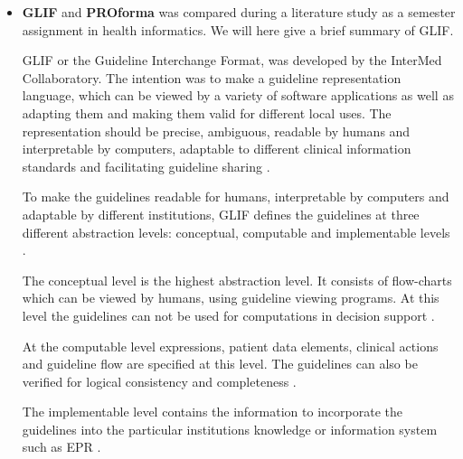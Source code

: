 \begin{itemize}
	\item \textbf{GLIF} and \textbf{PROforma} was compared during a literature study as a semester assignment in health informatics. We will here give a brief summary of GLIF.
	
	 GLIF or the Guideline Interchange Format, was developed by the InterMed Collaboratory. The intention was to make a guideline representation language, which can be viewed by a variety of software applications as well as adapting them and making them valid for different local uses. The representation should be precise, ambiguous, readable by humans and interpretable by computers, adaptable to different clinical information standards and facilitating guideline sharing \parencite{Peleg2000}. 

	To make the guidelines readable for humans, interpretable by computers and adaptable by different institutions, GLIF defines the guidelines at three different abstraction levels: conceptual, computable and implementable levels \parencite{DeClercq2008}. 
	
	The conceptual level is the highest abstraction level. It consists of
flow-charts which can be viewed by humans, using guideline viewing programs. At this level the guidelines can not
	be used for computations in decision support \parencite{Peleg2000}. 
	
	At the computable level expressions, patient data elements, clinical actions and guideline flow
	are specified at this level. The guidelines can also be verified for logical consistency and completeness \parencite{Peleg2000}.
	
	The implementable level contains the information to incorporate the guidelines into
	the particular institutions knowledge or information system such as EPR \parencite{Peleg2000}.
	

\end{itemize}
